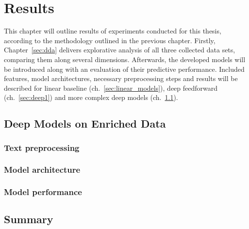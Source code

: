 \chapter{Results}
\label{ch:results}

This chapter will outline results of experiments conducted for this thesis,
according to the methodology outlined in the previous chapter.
Firstly, Chapter~\ref{sec:dda} delivers explorative analysis of all three
collected data sets, comparing them along several dimensions.
Afterwards, the developed models will be introduced along with an evaluation
of their predictive performance.
Included features, model architectures, necessary preprocessing steps and results will
be described for linear baseline (ch.~\ref{sec:linear_models}),
deep feedforward (ch.~\ref{sec:deep1}) and more complex deep models
(ch.~\ref{sec:deep_combined}).







\section{Deep Models on Enriched Data}
\label{sec:deep_combined}

\subsection{Text preprocessing}
\label{sub:text_preprocess}

\subsection{Model architecture}
\label{sub:model_architecture}

\subsection{Model performance}
\label{sub:comb_performance}

\section{Summary}
\label{sec:res_summary}
